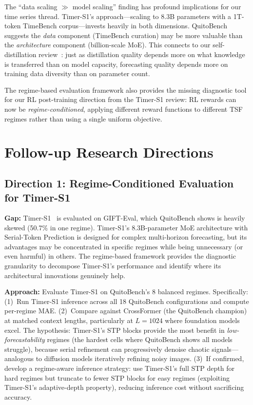 \documentclass[11pt]{article}
\begin{document}
The ``data scaling $\gg$ model scaling'' finding has profound implications for our time series thread. Timer-S1's approach---scaling to 8.3B parameters with a 1T-token TimeBench corpus---invests heavily in both dimensions. QuitoBench suggests the \textit{data} component (TimeBench curation) may be more valuable than the \textit{architecture} component (billion-scale MoE). This connects to our self-distillation review~\cite{selfdistill}: just as distillation quality depends more on what knowledge is transferred than on model capacity, forecasting quality depends more on training data diversity than on parameter count.

The regime-based evaluation framework also provides the missing diagnostic tool for our RL post-training direction from the Timer-S1 review: RL rewards can now be \textit{regime-conditioned}, applying different reward functions to different TSF regimes rather than using a single uniform objective.

\section{Follow-up Research Directions}

\subsection{Direction 1: Regime-Conditioned Evaluation for Timer-S1}

\textbf{Gap:} Timer-S1~\cite{timers1} is evaluated on GIFT-Eval, which QuitoBench shows is heavily skewed (50.7\% in one regime). Timer-S1's 8.3B-parameter MoE architecture with Serial-Token Prediction is designed for complex multi-horizon forecasting, but its advantages may be concentrated in specific regimes while being unnecessary (or even harmful) in others. The regime-based framework provides the diagnostic granularity to decompose Timer-S1's performance and identify where its architectural innovations genuinely help.

\textbf{Approach:} Evaluate Timer-S1 on QuitoBench's 8 balanced regimes. Specifically: (1)~Run Timer-S1 inference across all 18 QuitoBench configurations and compute per-regime MAE. (2)~Compare against CrossFormer (the QuitoBench champion) at matched context lengths, particularly at $L=1024$ where foundation models excel. The hypothesis: Timer-S1's STP blocks provide the most benefit in \textit{low-forecastability} regimes (the hardest cells where QuitoBench shows all models struggle), because serial refinement can progressively denoise chaotic signals---analogous to diffusion models iteratively refining noisy images. (3)~If confirmed, develop a regime-aware inference strategy: use Timer-S1's full STP depth for hard regimes but truncate to fewer STP blocks for easy regimes (exploiting Timer-S1's adaptive-depth property), reducing inference cost without sacrificing accuracy.
\end{document}
